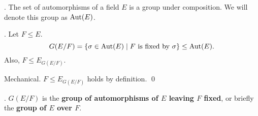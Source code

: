 \thm.  The set of automorphisms of a field \(E\) is a group under composition. We will denote this group as \(\mathrm{Aut}(E)\).

\thm. Let \(F \leq E\).
\[
    G(E/F) = \{\sigma \in \mathrm{Aut}(E) \mid F \text{ is fixed by } \sigma\} \leq \mathrm{Aut}(E).
\]
Also, \(F \leq E_{G(E/F)}\).

\pf Mechanical. \(F \leq E_{G(E/F)}\) holds by definition. \qed

. \(G(E/F)\) is the \textbf{group of automorphisms of \(E\) leaving \(F\) fixed}, or briefly the \textbf{group of \(E\) over \(F\)}.

\pagebreak
